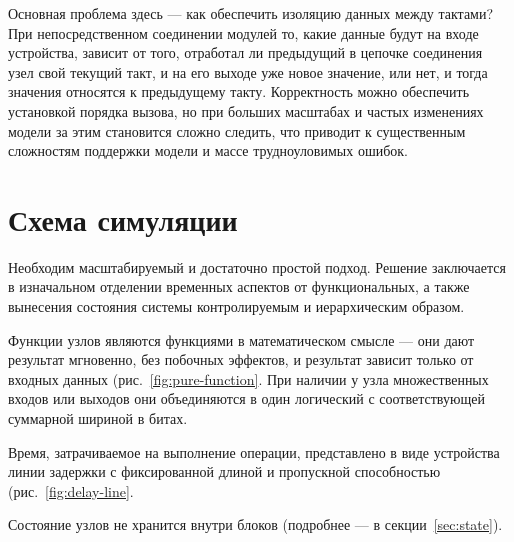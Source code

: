 Основная проблема здесь --- как обеспечить изоляцию данных между тактами? При непосредственном соединении модулей то, какие данные будут на входе устройства, зависит от того, отработал ли предыдущий в цепочке соединения узел свой текущий такт, и на его выходе уже новое значение, или нет, и тогда значения относятся к предыдущему такту. Корректность можно обеспечить установкой порядка вызова, но при больших масштабах и частых изменениях модели за этим становится сложно следить, что приводит к существенным сложностям поддержки модели и массе трудноуловимых ошибок.

\section{Схема симуляции}

Необходим масштабируемый и достаточно простой подход. Решение заключается в изначальном отделении временных аспектов от функциональных, а также вынесения состояния системы контролируемым и иерархическим образом. 

\begin{itemize*}
    \item Функции узлов являются функциями в математическом смысле --- они дают результат мгновенно, без побочных эффектов, и результат зависит только от входных данных (рис.~\ref{fig:pure-function}. При наличии у узла множественных входов или выходов они объединяются в один логический с соответствующей суммарной шириной в битах. 
    \item Время, затрачиваемое на выполнение операции, представлено в виде устройства линии задержки с фиксированной длиной и пропускной способностью (рис.~\ref{fig:delay-line}.
    \item Состояние узлов не хранится внутри блоков (подробнее --- в секции~\ref{sec:state}).
\end{itemize*}


